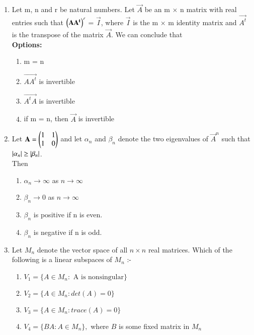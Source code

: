 \begin{enumerate}[label=\thesection.\arabic*.,ref=\thesection.\theenumi]
%
%
\solution

\item Let m, n and r be natural numbers. Let $\vec{A}$ be an m $\times$ n matrix with real entries such that $\left(\mathbf{AA^t}\right)^r$ = $\vec{I}$, where $\vec{I}$ is the m $\times$ m identity matrix and $\vec{A^t}$ is the transpose of the matrix $\vec{A}$. We can conclude that\\
\textbf{Options:}
\begin{enumerate}
\item m = n
\item $\vec{AA^t}$ is invertible
\item $\vec{A^tA}$ is invertible
\item if m = n, then $\vec{A}$ is invertible
\end{enumerate}
%
%
%

\item %
Let $\mathbf{A}=\begin{pmatrix}1 & 1\\1 & 0\end{pmatrix}$ and let $\alpha_n$ and $\beta_n$ denote the two eigenvalues of $\vec{A}^n$ such that $\left\vert\alpha_n\right\vert\geq\left\vert\beta_n\right\vert$.\\
Then
\begin{enumerate}
    \item $\alpha_n\rightarrow \infty$ as $n\rightarrow \infty$
    \item $\beta_n\rightarrow 0$ as $n\rightarrow \infty$
    \item $\beta_n$ is positive if n is even.
    \item $\beta_n$ is negative if n is odd.
\end{enumerate}
%
\solution

\item Let $M_n$ denote the vector space of all $n\times n$ real matrices. Which of the following is a linear subspaces of $M_n$ :-
\begin{enumerate}
\item $ V_1 = \{  A \in M_n : \text{ A is nonsingular} \}$
\item $ V_2 = \{  A \in M_n : det(A) = 0 \}$
\item $ V_3 = \{  A \in M_n : trace(A) = 0 \}$
\item $ V_4 = \{  BA : A \in M_n\},$ where $ B$ is some fixed matrix in $ M_n$
\end{enumerate}
%
\solution



\end{enumerate}
